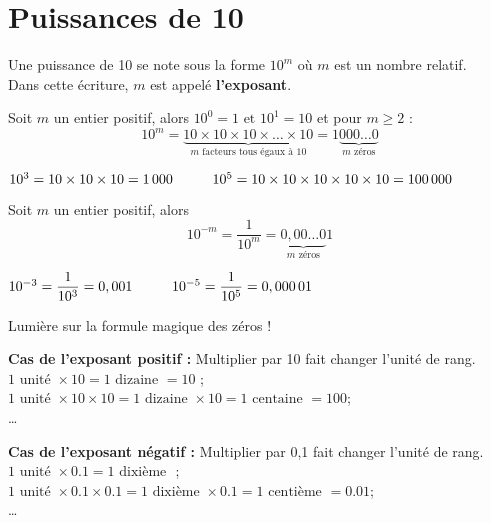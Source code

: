 \section{Puissances de 10}
\begin{definition}
    Une puissance de 10 se note sous la forme $10^m$ où $m$ est un nombre relatif.\\
    Dans cette écriture, $m$ est appelé \textbf{l'exposant}.
\end{definition}

\begin{definition}
    Soit $m$ un entier positif, alors $10^0=1\mbox{ et }10^1=10$ et pour $m\geq 2$ :
    $$10^m=\underbrace{10\times10\times10\times\ldots\times10}_{\mbox{$m$ facteurs tous égaux à 10}}=1\underbrace{000\ldots0}_{\mbox{$m$ zéros}}$$
\end{definition}

\begin{exemple*1}
    $10^3=10\times10\times10=1\,000\kern1cm10^5=10\times10\times10\times10\times10=100\,000$
\end{exemple*1}

\begin{definition}
    Soit $m$ un entier positif, alors
    $$10^{-m}=\frac1{10^m}=\underbrace{0,00\ldots0}_{\mbox{$m$ zéros}}1$$
\end{definition}

\begin{exemple*1}
    $10^{-3}=\dfrac1{10^3}=0,001\kern1cm10^{-5}=\dfrac1{10^5}=0,000\,01$
\end{exemple*1}

\begin{center}
\begin{myBox}{ Lumière sur la formule magique des zéros !}
    \begin{list}{}{}
        \item \textbf{Cas de  l'exposant positif :} Multiplier par 10 fait changer l'unité de rang.\\
        $1 \text{ unité } \times 10 = 1 \text{ dizaine } = 10$ ;\\
        $1 \text{ unité } \times 10 \times 10= 1 \text{ dizaine }\times 10 = 1 \text{ centaine } = 100$;\\
        \ldots
        \item \textbf{Cas de  l'exposant négatif :} Multiplier par 0,1 fait changer l'unité de rang.\\
        $1\text{ unité }\times \num{0.1} = 1 \text{ dixième }$ ;\\
        $1\text{ unité }\times \num{0.1} \times \num{0.1} = 1 \text{ dixième }\times \num{0.1} = 1\text{ centième } = \num{0.01}$;\\
        \ldots
    \end{list}

\end{myBox}
\end{center}

